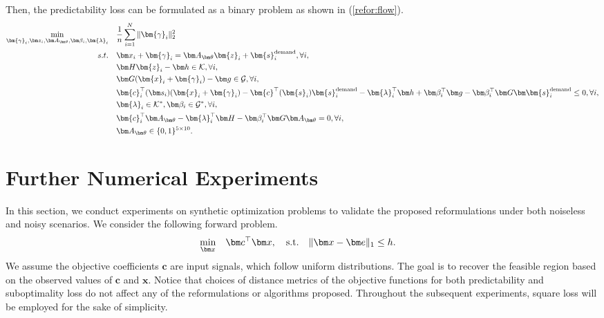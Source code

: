 \documentclass{article}
\def\x{\bm{x}}
\def\s{\bm{s}}
\def\K{\mathcal{K}}
\def\c{\bm{c}}
\def\v{\bm{v}}
\def\blambda{\bm{\lambda}}
\def\z{\bm{z}}
\def\bgamma{\bm{\gamma}}
\theoremstyle{plain}
\begin{document}
Then, the predictability loss can be formulated as a binary problem as shown in (\ref{refor:flow}).
\begin{equation}\label{refor:flow}
    \begin{aligned}
    \min_{\bgamma_{i}, \bm z_i, \bm A_{\bm \theta}, \bm \beta_i, \blambda_i} \quad & \frac{1}{n} \sum_{i=1}^N \|\bgamma_{i}\|_2^2\\
    s.t. \quad & %
    \bm x_i + \bgamma_{i} = \bm A_{\bm \theta} \z_i + \s^{\text{demand}}_i , \forall i,\\
    & \bm H \z_i - \bm h \in \mathcal{K}, \forall i,\\
    & \bm G (\x_i+\bgamma_i) - \bm g \in \mathcal{G}, \forall i,\\
    & \c^\top_i(\bm s_i)(\x_i+\bgamma_{i}) - \c^\top(\s_i)\s_i^{\text{demand}} - \blambda_i^\top \bm h +\bm \beta_i^\top \bm g - \bm \beta_i^\top\bm G \bm \s_i^{\text{demand}} \leq 0,\forall i,\\
    & \blambda_i \in \K^*, \bm \beta_i \in \mathcal{G}^*, \forall i,\\
    & \c^\top_i \bm A_{\bm \theta} - \blambda_i^\top \bm H - \bm \beta_i^\top \bm G \bm A_{\bm \theta} = 0, \forall i,\\
    & \bm A_{\bm \theta}  \in \{0,1\}^{5\times {10}}.
    \end{aligned}
\end{equation}



\section{Further Numerical Experiments}\label{sec:comp}
In this section, we conduct experiments on synthetic optimization problems to validate the proposed reformulations under both noiseless and noisy scenarios. We consider the following forward problem.
\begin{equation}\label{synthe:model1}
    \begin{aligned}
    \min_{\bm x} \quad & \bm c^\top \bm x, \quad {\rm s.t.} \quad \|\bm x - \bm e\|_1 \leq h.
    \end{aligned}
\end{equation}
We assume the objective coefficients $\bm c$ are input signals, which follow uniform distributions. The goal is to recover the feasible region based on the observed values of $\bm c$ and $\x$. {\color{black}Notice that choices of distance metrics of the objective functions for both predictability and suboptimality loss do not affect any of the reformulations or algorithms proposed. Throughout the subsequent experiments, square loss will be employed for the sake of simplicity.} 
\end{document}
